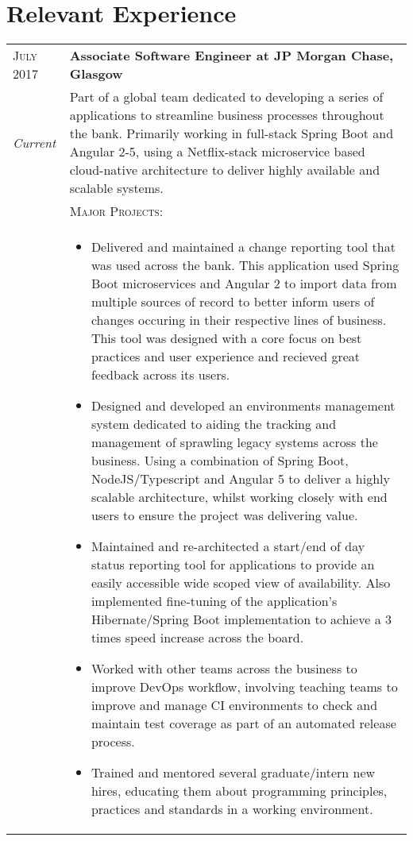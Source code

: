 \section{Relevant Experience}

\begin{tabular}{p{60pt}|p{11cm}}
	\hspace*{\fill}\textsc{July 2017} & \textbf{Associate Software Engineer at JP Morgan Chase, Glasgow} \\
	
	\hspace*{\fill}\emph{Current}& \small{
		Part of a global team dedicated to developing a series of applications to streamline business processes throughout the bank. Primarily working in full-stack Spring Boot and Angular 2-5, using a Netflix-stack microservice based cloud-native architecture to deliver highly available and scalable systems.
	} \\

	\ & \vspace{1pt}\textsc{Major Projects}: \\

	&\vspace{-0.9em}\begin{itemize}[itemsep=0pt,topsep=0pt,leftmargin=*]\small
		\item Delivered and maintained a change reporting tool that was used across the bank. This application used Spring Boot microservices and Angular 2 to import data from multiple sources of record to better inform users of changes occuring in their respective lines of business. This tool was designed with a core focus on best practices and user experience and recieved great feedback across its users. 
		\end{itemize}
		\begin{itemize}[itemsep=0pt,topsep=0pt,leftmargin=*]\small
		\item Designed and developed an environments management system dedicated to aiding the tracking and management of sprawling legacy systems across the business. Using a combination of Spring Boot, NodeJS/Typescript and Angular 5 to deliver a highly scalable architecture, whilst working closely with end users to ensure the project was delivering value.
		\item Maintained and re-architected a start/end of day status reporting tool for applications to provide an easily accessible wide scoped view of availability. Also implemented fine-tuning of the application's Hibernate/Spring Boot implementation to achieve a 3 times speed increase across the board.
		\item Worked with other teams across the business to improve DevOps workflow, involving teaching teams to improve and manage CI environments to check and maintain test coverage as part of an automated release process.
		\item Trained and mentored several graduate/intern new hires, educating them about programming principles, practices and standards in a working environment.
	\end{itemize}\vspace{-1.8em}


\end{tabular}

